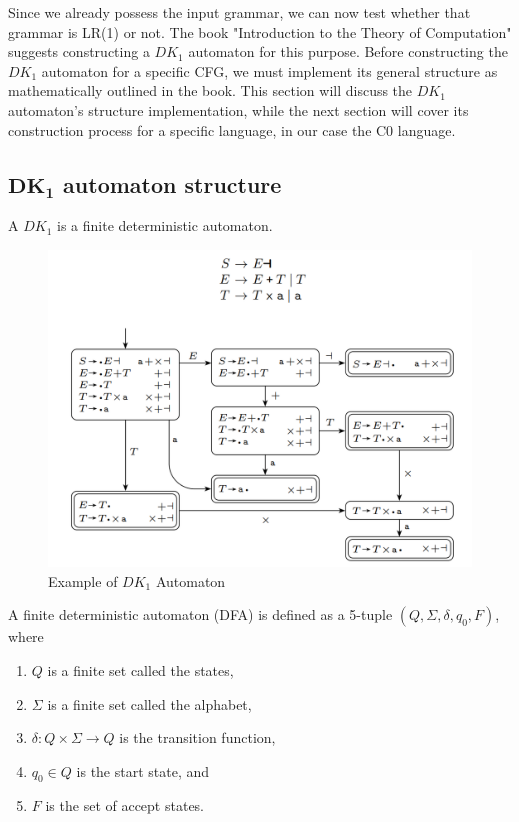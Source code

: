 Since we already possess the input grammar, we can now test whether that grammar is LR(1) or not. The book "Introduction to the Theory of Computation" suggests constructing a \( DK_{1} \) automaton for this purpose. Before constructing the \( DK_{1} \) automaton for a specific CFG, we must implement its general structure as mathematically outlined in the book. This section will discuss the \( DK_{1} \) automaton’s structure implementation, while the next section will cover its construction process for a specific language, in our case the C0 language.

\vspace{20pt}

\subsection{\(\boldsymbol{DK_{1}}\) automaton structure}

A \( DK_{1} \) is a finite deterministic automaton.


\begin{figure}[h!]
    \includegraphics[width=\linewidth]{DK1 example.png}
    \caption{Example of \(DK_{1}\) Automaton}
    \label{2}
\end{figure}

\begin{definition}[2.0]
    A finite deterministic automaton (DFA) is defined as a 5-tuple  \((Q, \Sigma, \delta, q_{0}, F)\), where
    \begin{enumerate}
        \item \(Q\) is a finite set called the states,
        \item \(\Sigma\) is a finite set called the alphabet,
        \item \(\delta : Q \times \Sigma \to Q\) is the transition function,
        \item \(q_{0} \in Q\) is the start state, and
        \item \(F\) is the set of accept states.
    \end{enumerate}
\end{definition}
\setlength{\parindent}{0pt}

